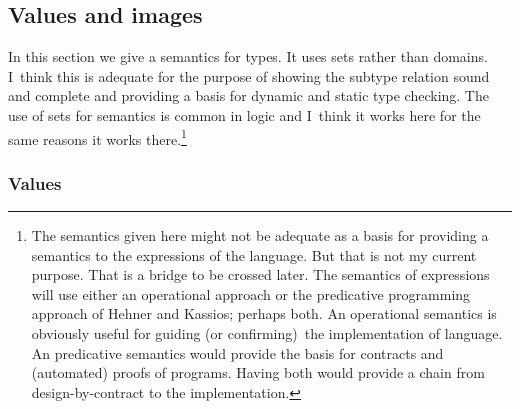 \documentclass[12pt]{article}
\begin{document}
\subsection{Values and images}

In this section we give a semantics for types. It uses sets rather than
domains. I\ think this is adequate for the purpose of showing the subtype
relation sound and complete and providing a basis for dynamic and static
type checking. The use of sets for semantics is common in logic and I\ think
it works here for the same reasons it works there.\footnote{%
The semantics given here might not be adequate as a basis for providing a
semantics to the expressions of the language. But that is not my current
purpose. That is a bridge to be crossed later. The semantics of expressions
will use either an operational approach or the predicative programming
approach of Hehner and Kassios; perhaps both. An operational semantics is
obviously useful for guiding (or confirming)\ the implementation of
language. An predicative semantics would provide the basis for contracts and
(automated) proofs of programs. Having both would provide a chain from
design-by-contract to the implementation.}

\subsubsection{Values}
\end{document}
